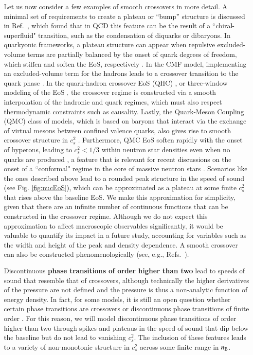 \documentclass[aps,prd,nofootinbib,tightenlines,notitlepage,floatfix,superscriptaddress,showkeys,twocolumn]{revtex4-1}
\begin{document}
Let us now consider a few examples of smooth crossovers in more detail. A minimal set of requirements to create a plateau or ``bump'' structure is discussed in Ref.~\cite{Hippert:2021gfs}, which found that in QCD this feature can be the result of a ``chiral-superfluid" transition, such as the condensation of diquarks or dibaryons. In quarkyonic frameworks, a plateau structure can appear when repulsive excluded-volume terms are partially balanced by the onset of quark degrees of freedom, which stiffen and soften the EoS, respectively \cite{Duarte:2023cki,Duarte:2021tsx,Duarte:2020kvi}. 
In the CMF model, implementing an excluded-volume term for the hadrons leads to a crossover transition to the quark phase \cite{Dexheimer:2014pea}. In the quark-hadron crossover EoS (QHC) \cite{Baym:2019iky}, or three-window modeling of the EoS \cite{Kojo:2015fua}, the crossover regime is constructed via a smooth interpolation of the hadronic and quark regimes, which must also respect thermodynamic constraints such as causality. Lastly, the Quark-Meson Coupling (QMC) class of models, which is based on baryons that interact via the exchange of virtual mesons between confined valence quarks, also gives rise to smooth crossover structure in $c_s^2$ \cite{Stone:2019blq,Guichon:1995ue}. Furthermore, QMC EoS soften rapidly with the onset of hyperons, leading to $c_s^2 < 1/3$ within neutron star densities even when no quarks are produced \cite{Stone:2019blq}, a feature that is relevant for recent discussions on the onset of a ``conformal" regime in the core of massive neutron stars \cite{Annala:2023cwx,Gorda:2022jvk,Annala:2019puf}. Scenarios like the ones described above lead to a rounded peak structure in the speed of sound (see Fig. \ref{fig:nucEoS}), which can be approximated as a plateau at some finite $c_s^2$ that rises above the baseline EoS. We make this approximation for simplicity, given that there are an infinite number of continuous functions that can be constructed in the crossover regime. Although we do not expect this approximation to affect macroscopic observables significantly, it would be valuable to quantify its impact in a future study, accounting for variables such as the width and height of the peak and density dependence. A smooth crossover can also be constructed phenomenologically (see, e.g., Refs.~\cite{Tews:2018kmu,Ivanytskyi:2022wln, Ayriyan:2021prr}).



Discontinuous {\bf phase transitions of order higher than two} lead to speeds of sound that resemble that of crossovers, although technically the higher derivatives of the pressure are not defined and the pressure is thus a non-analytic function of energy density. In fact, for some models, it is still an open question whether certain phase transitions are crossovers or discontinuous phase transitions of finite order \cite{CMF_MUSES}. For this reason, we will model discontinuous phase transitions of order higher than two through spikes and plateaus in the speed of sound that dip below the baseline but do not lead to vanishing $c_{s}^{2}$. The inclusion of these features leads to a variety of non-monotonic structure in $c_s^2$ across some finite range in $n_{\rm B}$.
\end{document}
